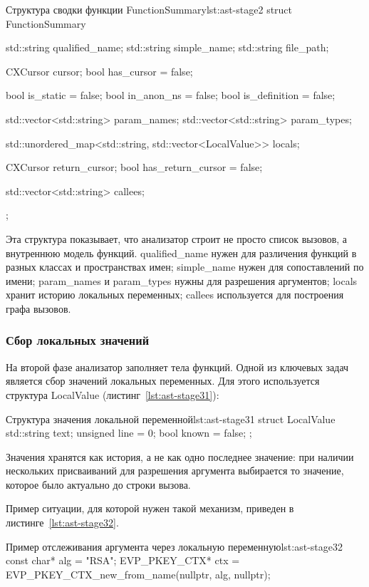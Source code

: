 \documentclass{itmo-vkr}
\begin{document}
\begin{itmolisting}[C++]{Структура сводки функции FunctionSummary}{lst:ast-stage2}
struct FunctionSummary {
	std::string qualified_name;
	std::string simple_name;
	std::string file_path;
	
	CXCursor cursor{};
	bool has_cursor = false;
	
	bool is_static = false;
	bool in_anon_ns = false;
	bool is_definition = false;
	
	std::vector<std::string> param_names;
	std::vector<std::string> param_types;
	
	std::unordered_map<std::string, std::vector<LocalValue>> locals;
	
	CXCursor return_cursor{};
	bool has_return_cursor = false;
	
	std::vector<std::string> callees;
};
\end{itmolisting}

Эта структура показывает, что анализатор строит не просто список вызовов, а внутреннюю модель функций. qualified\_name нужен для различения функций в разных классах и пространствах имен; simple\_name нужен для сопоставлений по имени; param\_names и param\_types нужны для разрешения аргументов; locals хранит историю локальных переменных; callees используется для построения графа вызовов.

\subsubsection{Сбор локальных значений}

На второй фазе анализатор заполняет тела функций. Одной из ключевых задач является сбор значений локальных переменных. Для этого используется структура LocalValue (листинг~\ref{lst:ast-stage31}):

\begin{itmolistingfloat}[C++]{Структура значения локальной переменной}{lst:ast-stage31}
struct LocalValue {
    std::string text;
    unsigned line = 0;
    bool known = false;
};
\end{itmolistingfloat}

Значения хранятся как история, а не как одно последнее значение: при наличии нескольких присваиваний для разрешения аргумента выбирается то значение, которое было актуально до строки вызова.

Пример ситуации, для которой нужен такой механизм, приведен в листинге~\ref{lst:ast-stage32}.

\begin{itmolisting}[C++]{Пример отслеживания аргумента через локальную переменную}{lst:ast-stage32}
	const char* alg = "RSA";
	EVP_PKEY_CTX* ctx = EVP_PKEY_CTX_new_from_name(nullptr, alg, nullptr);
\end{itmolisting}
\end{document}
